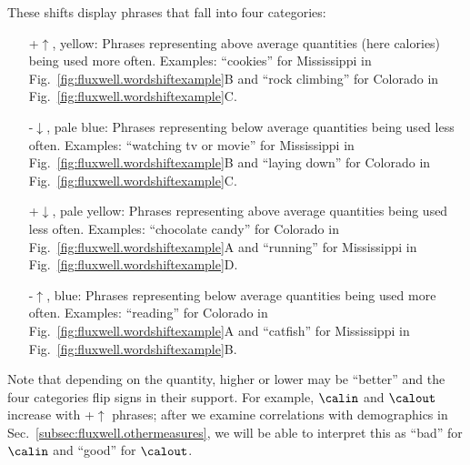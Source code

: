 These shifts display phrases that fall into four categories:
\begin{itemize}[leftmargin=64pt]
\item[+$\uparrow$, yellow:]
  Phrases representing above average quantities (here calories)
  being used more often.
  Examples: 
  ``cookies'' for Mississippi in
  Fig.~\ref{fig:fluxwell.wordshiftexample}B
  and 
  ``rock climbing'' for Colorado in Fig.~\ref{fig:fluxwell.wordshiftexample}C.
\item[-$\downarrow$, pale blue:]
  Phrases representing below average quantities
  being used less often.
  Examples: 
  ``watching tv or movie'' for Mississippi in
  Fig.~\ref{fig:fluxwell.wordshiftexample}B
  and 
  ``laying down'' for Colorado in
  Fig.~\ref{fig:fluxwell.wordshiftexample}C.
\item[+$\downarrow$, pale yellow:]
  Phrases representing above average quantities
  being used less often.
  Examples: 
  ``chocolate candy'' for Colorado in
  Fig.~\ref{fig:fluxwell.wordshiftexample}A
  and 
  ``running'' for Mississippi in Fig.~\ref{fig:fluxwell.wordshiftexample}D.
\item[-$\uparrow$, blue:]
  Phrases representing below average quantities
  being used more often.
  Examples: 
  ``reading'' for Colorado 
  in Fig.~\ref{fig:fluxwell.wordshiftexample}A
  and
  ``catfish'' for Mississippi in
  Fig.~\ref{fig:fluxwell.wordshiftexample}B.
\end{itemize}
Note that depending on the quantity, higher or lower may be ``better''
and the four categories flip signs in their support.
For example, $\calin$ and $\calout$ increase with +$\uparrow$ phrases;
after we examine correlations with demographics in 
Sec.~\ref{subsec:fluxwell.othermeasures},
we will be able to interpret this as ``bad'' for $\calin$ and ``good'' for
$\calout$.

